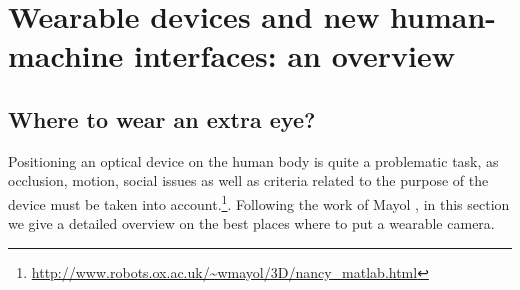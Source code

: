 
\chapter{Wearable devices and new human-machine interfaces: an overview}



\section{Where to wear an extra eye?}
Positioning an optical device on the human body is quite a problematic task, as occlusion, motion, social issues as well as criteria related to the purpose of the device must be taken into account.\footnote{\url{http://www.robots.ox.ac.uk/~wmayol/3D/nancy_matlab.html}}. Following the work of Mayol \etal \cite{mayol2001positioning}, in this section we give a detailed overview on the best places where to put a wearable camera.

